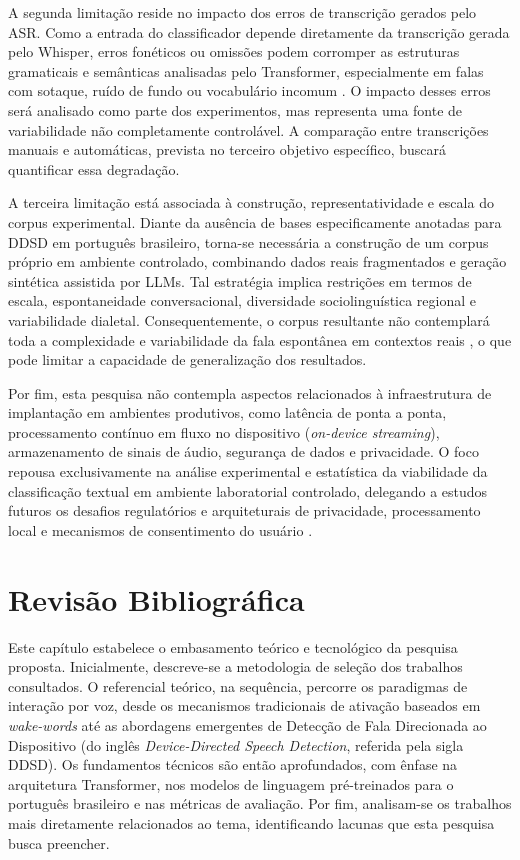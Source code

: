 \documentclass[
    12pt,                %
    openright,           %
    oneside,             %
    a4paper,             %
    english,             %
    brazil               %
]{abntex2}
\begin{document}
A segunda limitação reside no impacto dos erros de transcrição gerados pelo ASR. Como a entrada do classificador depende diretamente da transcrição gerada pelo Whisper, erros fonéticos ou omissões podem corromper as estruturas gramaticais e semânticas analisadas pelo Transformer, especialmente em falas com sotaque, ruído de fundo ou vocabulário incomum \cite{Bevilacqua2024}. O impacto desses erros será analisado como parte dos experimentos, mas representa uma fonte de variabilidade não completamente controlável. A comparação entre transcrições manuais e automáticas, prevista no terceiro objetivo específico, buscará quantificar essa degradação.

A terceira limitação está associada à construção, representatividade e escala do corpus experimental. Diante da ausência de bases especificamente anotadas para DDSD em português brasileiro, torna-se necessária a construção de um corpus próprio em ambiente controlado, combinando dados reais fragmentados e geração sintética assistida por LLMs. Tal estratégia implica restrições em termos de escala, espontaneidade conversacional, diversidade sociolinguística regional e variabilidade dialetal. Consequentemente, o corpus resultante não contemplará toda a complexidade e variabilidade da fala espontânea em contextos reais \cite{CORAA2023}, o que pode limitar a capacidade de generalização dos resultados.

Por fim, esta pesquisa não contempla aspectos relacionados à infraestrutura de implantação em ambientes produtivos, como latência de ponta a ponta, processamento contínuo em fluxo no dispositivo (\textit{on-device streaming}), armazenamento de sinais de áudio, segurança de dados e privacidade. O foco repousa exclusivamente na análise experimental e estatística da viabilidade da classificação textual em ambiente laboratorial controlado, delegando a estudos futuros os desafios regulatórios e arquiteturais de privacidade, processamento local e mecanismos de consentimento do usuário \cite{Chen2021}.

\chapter{Revisão Bibliográfica}
\label{cap:revisao}

Este capítulo estabelece o embasamento teórico e tecnológico da pesquisa proposta. Inicialmente, descreve-se a metodologia de seleção dos trabalhos consultados. O referencial teórico, na sequência, percorre os paradigmas de interação por voz, desde os mecanismos tradicionais de ativação baseados em \textit{wake-words} até as abordagens emergentes de Detecção de Fala Direcionada ao Dispositivo (do inglês \textit{Device-Directed Speech Detection}, referida pela sigla DDSD). Os fundamentos técnicos são então aprofundados, com ênfase na arquitetura Transformer, nos modelos de linguagem pré-treinados para o português brasileiro e nas métricas de avaliação. Por fim, analisam-se os trabalhos mais diretamente relacionados ao tema, identificando lacunas que esta pesquisa busca preencher.
\end{document}
